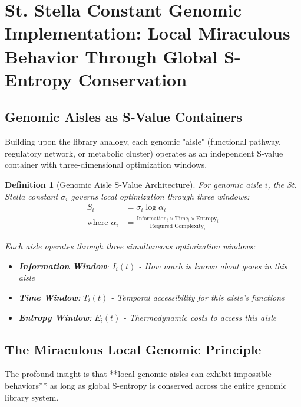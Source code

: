 \documentclass[12pt,a4paper]{article}
\newtheorem{definition}[theorem]{Definition}
\begin{document}
\section{St. Stella Constant Genomic Implementation: Local Miraculous Behavior Through Global S-Entropy Conservation}

\subsection{Genomic Aisles as S-Value Containers}

Building upon the library analogy, each genomic "aisle" (functional pathway, regulatory network, or metabolic cluster) operates as an independent S-value container with three-dimensional optimization windows.

\begin{definition}[Genomic Aisle S-Value Architecture]
For genomic aisle $i$, the St. Stella constant $\sigma_i$ governs local optimization through three windows:
\begin{align}
S_i &= \sigma_i \log \alpha_i \\
\text{where } \alpha_i &= \frac{\text{Information}_i \times \text{Time}_i \times \text{Entropy}_i}{\text{Required Complexity}_i}
\end{align}

Each aisle operates through three simultaneous optimization windows:
\begin{itemize}
\item \textbf{Information Window}: $I_i(t)$ - How much is known about genes in this aisle
\item \textbf{Time Window}: $T_i(t)$ - Temporal accessibility for this aisle's functions  
\item \textbf{Entropy Window}: $E_i(t)$ - Thermodynamic costs to access this aisle
\end{itemize}
\end{definition}

\subsection{The Miraculous Local Genomic Principle}

The profound insight is that **local genomic aisles can exhibit impossible behaviors** as long as global S-entropy is conserved across the entire genomic library system.
\end{document}
